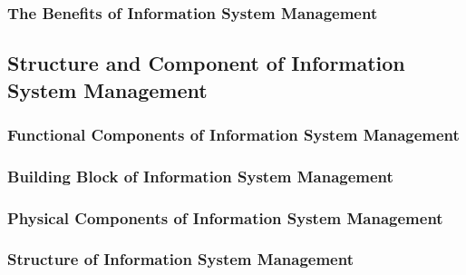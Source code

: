 \documentclass[12pt,titlepage]{article}
\begin{document}
\subsubsection{The Benefits of Information System Management}

\subsection{Structure and Component of Information System Management}
\subsubsection{Functional Components of Information System Management}
\subsubsection{Building Block of Information System Management}
\subsubsection{Physical Components of Information System Management}
\subsubsection{Structure of Information System Management}
\end{document}
